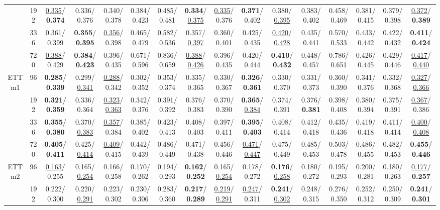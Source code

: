 \begin{table}[t]
{\begin{tabular}{@{}cc@{\hspace{5pt}}*{7}{c}@{\hspace{8pt}}*{7}{c}@{}}
 & 192 & \uline{0.335}/\textbf{0.374} & 0.336/0.376 & 0.340/0.378 & 0.384/0.423 & 0.485/0.481 & \textbf{0.334}/\uline{0.375} & \uline{0.335}/0.376 & \textbf{0.371}/0.402 & 0.380/\uline{0.395} & 0.383/0.402 & 0.458/0.469 & 0.381/0.415 & 0.379/0.398 & \uline{0.372}/\textbf{0.389} \\
 & 336 & 0.361/0.399 & \textbf{0.355}/\textbf{0.395} & \uline{0.356}/0.398 & 0.465/0.479 & 0.582/0.536 & 0.357/\uline{0.397} & 0.360/0.401 & 0.425/0.435 & \uline{0.420}/\uline{0.428} & 0.435/0.441 & 0.570/0.533 & 0.433/0.442 & 0.422/0.432 & \textbf{0.411}/\textbf{0.424} \\
 & 720 & \uline{0.388}/0.429 & \textbf{0.384}/\textbf{0.423} & 0.396/0.435 & 0.671/0.596 & 0.836/0.659 & \uline{0.388}/\uline{0.426} & 0.396/0.435 & 0.420/0.444 & \textbf{0.410}/\textbf{0.432} & 0.448/0.457 & 0.786/0.651 & 0.426/0.445 & 0.429/0.446 & \uline{0.417}/\uline{0.440} \\
\midrule
\multirow{4}{*}{ETTm1} & 96 & \textbf{0.285}/\textbf{0.339} & 0.299/\uline{0.341} & \uline{0.288}/0.342 & 0.302/0.352 & 0.353/0.374 & 0.335/0.365 & 0.330/0.367 & \textbf{0.326}/\textbf{0.361} & 0.330/0.370 & 0.331/0.373 & 0.360/0.390 & 0.341/0.376 & 0.332/0.368 & \uline{0.327}/\uline{0.366} \\
 & 192 & \textbf{0.321}/\textbf{0.359} & 0.336/0.364 & \uline{0.323}/\uline{0.363} & 0.342/0.376 & 0.391/0.392 & 0.376/0.383 & 0.370/0.390 & \textbf{0.365}/\uline{0.384} & 0.374/0.391 & 0.376/\textbf{0.381} & 0.398/0.408 & 0.380/0.394 & 0.375/0.391 & \uline{0.367}/0.386 \\
 & 336 & \textbf{0.355}/\textbf{0.380} & 0.370/\uline{0.383} & \uline{0.357}/0.384 & 0.385/0.402 & 0.423/0.413 & 0.408/0.403 & 0.397/0.411 & \textbf{0.395}/\textbf{0.403} & 0.408/0.414 & 0.412/0.418 & 0.435/0.436 & 0.419/0.418 & 0.411/0.414 & \uline{0.400}/\uline{0.408} \\
 & 720 & \textbf{0.405}/\textbf{0.411} & 0.425/\uline{0.414} & \uline{0.409}/0.415 & 0.442/0.439 & 0.486/0.449 & 0.471/0.438 & 0.456/0.446 & \uline{0.471}/\uline{0.447} & 0.475/0.449 & 0.485/0.453 & 0.503/0.478 & 0.486/0.455 & 0.482/0.453 & \textbf{0.455}/\textbf{0.446} \\
\midrule
\multirow{4}{*}{ETTm2} & 96 & \uline{0.163}/0.255 & 0.165/\uline{0.254} & 0.166/0.258 & 0.170/0.262 & 0.194/0.293 & \textbf{0.162}/\textbf{0.252} & 0.165/\uline{0.254} & 0.178/0.272 & \textbf{0.176}/\uline{0.258} & 0.180/0.272 & 0.195/0.293 & 0.200/0.281 & 0.180/0.263 & \uline{0.177}/\textbf{0.257} \\
 & 192 & 0.222/0.300 & 0.220/\uline{0.291} & 0.223/0.302 & 0.230/0.306 & 0.283/0.360 & \textbf{0.217}/\textbf{0.289} & \uline{0.219}/\uline{0.291} & \uline{0.247}/0.311 & \textbf{0.241}/\uline{0.302} & 0.248/0.315 & 0.276/0.350 & 0.252/0.312 & 0.250/0.309 & \textbf{0.241}/\textbf{0.301} \\

\end{tabular}}
\end{table}
